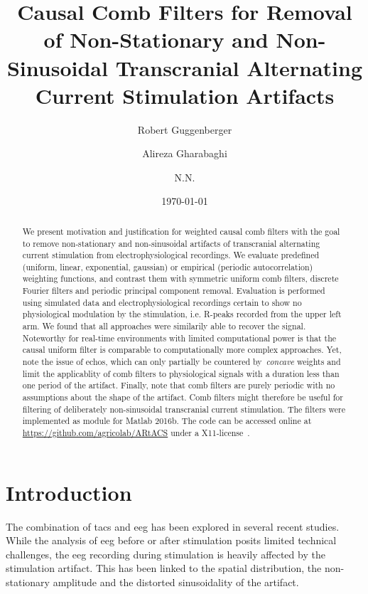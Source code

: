 \documentclass[a4paper]{article}
\title{Causal Comb Filters for Removal of Non-Stationary and Non-Sinusoidal Transcranial Alternating Current Stimulation Artifacts}
\author[1,*]{Robert Guggenberger}
\author[1]{Alireza Gharabaghi}
\author[1]{N.N.}
\affil[1]{Department for Translational Neurosurgery, University Hospital Tübingen}
\affil[*]{Corresponding author: \email{robert.guggenberger@posteo.eu}}
\date{\today}
\begin{document}
\maketitle
\thispagestyle{fancy}

\begin{abstract}
We present motivation and justification for weighted causal comb filters with the goal to remove non-stationary and non-sinusoidal artifacts of transcranial alternating current stimulation from electrophysiological recordings.
We evaluate predefined (uniform, linear, exponential, gaussian) or empirical (periodic autocorrelation) weighting functions, and contrast them with symmetric uniform comb filters, discrete Fourier filters and periodic principal component removal.
Evaluation is performed using simulated data and electrophysiological recordings certain to show no physiological modulation by the stimulation, i.e. R-peaks recorded from the upper left arm.
We found that all approaches were similarily able to recover the signal. Noteworthy for real-time environments with limited computational power is that the causal uniform filter is comparable to computationally more complex approaches.
Yet, note the issue of echos, which can only partially be countered by~\emph{concave} weights and limit the applicablity of comb filters to physiological signals with a duration less than one period of the artifact.
Finally, note that comb filters are purely periodic with no assumptions about the shape of the artifact. Comb filters might therefore be useful for filtering of deliberately non-sinusoidal transcranial current stimulation.
The filters were implemented as module for Matlab 2016b. The code can be accessed online at \url{https://github.com/agricolab/ARtACS} under a X11-license~\citep{Guggenberger2017}.

\end{abstract}

\section{Introduction}

The combination of \gls{tacs} and \gls{eeg} has been explored in several recent studies. While the analysis of \gls{eeg} before or after stimulation posits limited technical challenges, the \gls{eeg} recording during stimulation is heavily affected by the stimulation artifact. This has been linked to the spatial distribution, the non-stationary amplitude and the distorted sinusoidality of the artifact.
\end{document}

